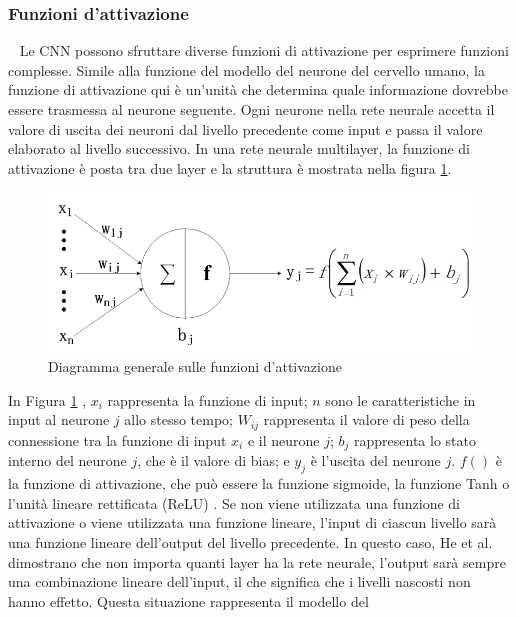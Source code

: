 \subsubsection{Funzioni d'attivazione}~\newline
\label{subsubsec:act_func}
Le CNN possono sfruttare diverse funzioni di attivazione per esprimere funzioni complesse. Simile alla funzione del
modello del neurone del cervello umano, la funzione di attivazione qui è un'unità che determina quale informazione
dovrebbe essere trasmessa al neurone seguente.
Ogni neurone nella rete neurale accetta il valore di uscita dei neuroni dal livello precedente come input e passa il
valore elaborato al livello successivo.
In una rete neurale multilayer, la funzione di attivazione è posta tra due layer e la struttura 
è mostrata nella figura \ref{fig:activation_func}.
\begin{figure}[h!]
    \centering
    \includegraphics[width=\textwidth]{images/activaiton_func.png}
    \caption{Diagramma generale sulle funzioni d'attivazione \cite{9451544}}
    \label{fig:activation_func}
\end{figure}
In Figura \ref{fig:activation_func} , $x_{i}$ rappresenta la funzione di input; $n$ sono le caratteristiche in input 
al neurone $j$ allo stesso tempo; $W_{ij}$ rappresenta il valore di peso della connessione tra la funzione di input
$x_{i}$ e il neurone $j$; $b_{j}$ rappresenta lo stato interno del neurone $j$, che è il valore di bias; 
e $y_{j}$ è l'uscita del neurone $j$. $f()$ è la funzione di attivazione, che può essere la funzione sigmoide, 
la funzione Tanh \cite{726791} o l'unità lineare rettificata (ReLU) \cite{nair2010rectified}.
Se non viene utilizzata una funzione di attivazione o viene utilizzata una funzione lineare, l'input di ciascun 
livello sarà una funzione lineare dell'output del livello precedente. In questo caso, He et al. \cite{he2015delving}
dimostrano che non importa quanti layer ha la rete neurale, l'output sarà sempre una combinazione lineare dell'input, 
il che significa che i livelli nascosti non hanno effetto. Questa situazione rappresenta il modello del 

